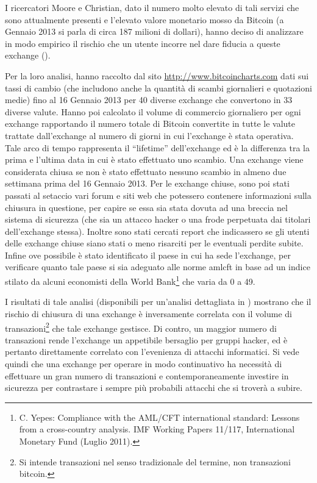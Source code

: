 I ricercatori Moore e Christian, dato il numero molto elevato di tali servizi che sono attualmente presenti e l'elevato valore monetario mosso da Bitcoin (a Gennaio 2013 si parla di circa 187 milioni di dollari), hanno deciso di analizzare in modo empirico il rischio che un utente incorre nel dare fiducia a queste exchange (\cite{middleman}).

Per la loro analisi, hanno raccolto dal sito \url{http://www.bitcoincharts.com} dati sui tassi di cambio (che includono anche la quantità di scambi giornalieri e quotazioni medie) fino al 16 Gennaio 2013 per 40 diverse exchange che convertono in 33 diverse valute.
Hanno poi calcolato il volume di commercio giornaliero per ogni exchange rapportando il numero totale di Bitcoin convertite in tutte le valute trattate dall'exchange al numero di giorni in cui l'exchange è stata operativa. Tale arco di tempo rappresenta il ``lifetime'' dell'exchange ed è la differenza tra la prima e l'ultima data in cui è stato effettuato uno scambio. Una exchange viene considerata chiusa se non è stato effettuato nessuno scambio in almeno due settimana prima del 16 Gennaio 2013.
Per le exchange chiuse, sono poi stati passati al setaccio vari forum e siti web che potessero contenere informazioni sulla chiusura in questione, per capire se essa sia stata dovuta ad una breccia nel sistema di sicurezza (che sia un attacco hacker o una frode perpetuata dai titolari dell'exchange stessa). Inoltre sono stati cercati report che indicassero se gli utenti delle exchange chiuse siano stati o meno risarciti per le eventuali perdite subite.
Infine ove possibile è stato identificato il paese in cui ha sede l'exchange, per verificare quanto tale paese si sia adeguato alle norme \gls{amlcft} in base ad un indice stilato da alcuni economisti della World Bank\footnote{C. Yepes: Compliance with the AML/CFT international standard: Lessons from a cross-country analysis. IMF Working Papers 11/117, International Monetary Fund (Luglio 2011).} che varia da 0 a 49.

I risultati di tale analisi (disponibili per un'analisi dettagliata in \cite{middleman}) mostrano che il rischio di chiusura di una exchange è inversamente correlata con il volume di transazioni\footnote{Si intende transazioni nel senso tradizionale del termine, non transazioni bitcoin.} che tale exchange gestisce. Di contro, un maggior numero di transazioni rende l'exchange un appetibile bersaglio per gruppi hacker, ed è pertanto direttamente correlato con l'evenienza di attacchi informatici.
Si vede quindi che una exchange per operare in modo continuativo ha necessità di effettuare un gran numero di transazioni e contemporaneamente investire in sicurezza per contrastare i sempre più probabili attacchi che si troverà a subire.
